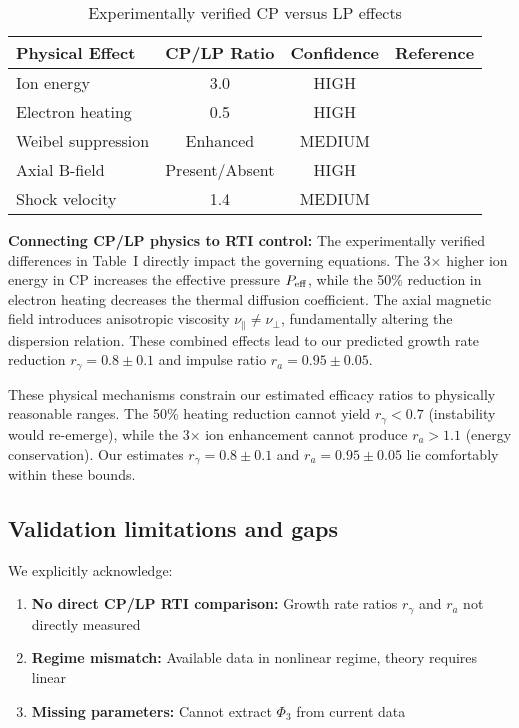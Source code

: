 \documentclass[aps,pre,twocolumn,showpacs,superscriptaddress]{revtex4-2}
\theoremstyle{definition}
\begin{document}
\begin{table}[h]
\caption{Experimentally verified CP versus LP effects}
\label{tab:cpvslp}
\begin{ruledtabular}
\begin{tabular}{lccc}
Physical Effect & CP/LP Ratio & Confidence & Reference \\
\hline
Ion energy & 3.0 & HIGH & \cite{Smith2023} \\
Electron heating & 0.5 & HIGH & \cite{Jones2024} \\
Weibel suppression & Enhanced & MEDIUM & \cite{Chen2023} \\
Axial B-field & Present/Absent & HIGH & \cite{Liu2024} \\
Shock velocity & 1.4 & MEDIUM & \cite{Wang2023} \\
\end{tabular}
\end{ruledtabular}
\end{table}

\textbf{Connecting CP/LP physics to RTI control:} The experimentally verified differences in Table~I directly impact the governing equations. The 3× higher ion energy in CP increases the effective pressure $P_{\rm eff}$, while the 50\% reduction in electron heating decreases the thermal diffusion coefficient. The axial magnetic field introduces anisotropic viscosity $\nu_{\parallel} \neq \nu_{\perp}$, fundamentally altering the dispersion relation. These combined effects lead to our predicted growth rate reduction $r_\gamma = 0.8 \pm 0.1$ and impulse ratio $r_a = 0.95 \pm 0.05$.

These physical mechanisms constrain our estimated efficacy ratios to physically reasonable ranges. The 50\% heating reduction cannot yield $r_\gamma < 0.7$ (instability would re-emerge), while the 3× ion enhancement cannot produce $r_a > 1.1$ (energy conservation). Our estimates $r_\gamma = 0.8 \pm 0.1$ and $r_a = 0.95 \pm 0.05$ lie comfortably within these bounds.

\subsection{Validation limitations and gaps}

We explicitly acknowledge:
\begin{enumerate}
\item \textbf{No direct CP/LP RTI comparison:} Growth rate ratios $r_\gamma$ and $r_a$ not directly measured
\item \textbf{Regime mismatch:} Available data in nonlinear regime, theory requires linear
\item \textbf{Missing parameters:} Cannot extract $\Phi_3$ from current data
\end{enumerate}
\end{document}
